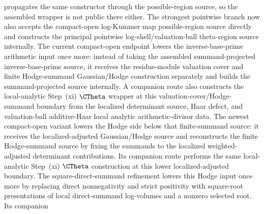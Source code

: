 \begin{proposition}
  propagates the same constructor through the possible-region source, so the
  assembled wrapper is not public there either.  The strongest
  pointwise branch now also accepts the compact-open log-Kummer map
  possible-region source directly and constructs the principal pointwise
  log-shell/valuation-ball theta-region source internally.  The current
  compact-open endpoint lowers the inverse-base-prime arithmetic input once
  more: instead of taking the assembled summand-projected inverse-base-prime
  source, it receives the residue-module valuation cover and finite
  Hodge-summand Gaussian/Hodge construction separately and builds the
  summand-projected source internally.  A companion route
  also constructs the local-analytic Step~(xi) \(\CTheta\) wrapper at this
  valuation-cover/Hodge-summand boundary from the localized determinant source,
  Haar defect, and valuation-ball additive-Haar local analytic
  arithmetic-divisor data.  The newest compact-open variant lowers
  the Hodge side below that finite-summand source: it receives the
  localized-adjusted Gaussian/Hodge source and reconstructs the finite
  Hodge-summand source by fixing the summands to the localized
  weighted-adjusted determinant contributions.  Its companion route
  performs the same local-analytic Step~(xi) \(\CTheta\) construction at this
  lower localized-adjusted boundary.  The square-direct-summand
  refinement lowers this Hodge input once more by replacing direct
  nonnegativity and strict positivity with square-root presentations of local
  direct-summand log-volumes and a nonzero selected root.  Its companion

\end{proposition}
